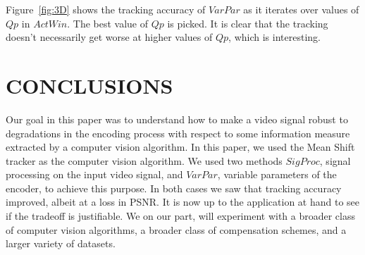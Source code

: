 \documentclass{article}
\begin{document}
Figure~\ref{fig:3D} shows the tracking accuracy of $VarPar$ as it iterates over values of $Qp$ in $ActWin$.  The best value of $Qp$ is picked.  It is clear that the tracking doesn't necessarily get worse at higher values of $Qp$, which is interesting.  
\\

\section{CONCLUSIONS}
Our goal in this paper was to understand how to make a video signal robust to degradations in the encoding process with respect to some information measure extracted by a computer vision algorithm.  In this paper, we used the Mean Shift tracker as the computer vision algorithm.  We used two methods $SigProc$, signal processing on the input video signal, and $VarPar$, variable parameters of the encoder, to achieve this purpose.  In both cases we saw that tracking accuracy improved, albeit at a loss in PSNR.  It is now up to the application at hand to see if the tradeoff is justifiable.  We on our part, will experiment with a broader class of computer vision algorithms, a broader class of compensation schemes, and a larger variety of datasets.



\end{document}
